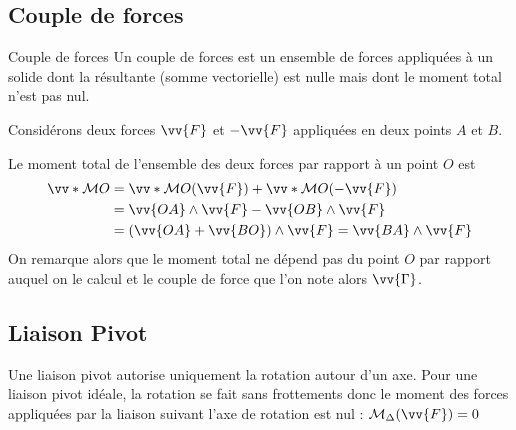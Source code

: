 \documentclass{cours}
\begin{document}
\subsection{Couple de forces}%
\label{sub:couple}
\begin{definition}{Couple de forces}
 Un couple de forces est un ensemble de forces appliquées à un solide dont la résultante (somme vectorielle) est nulle mais dont le moment total n'est pas nul. 
\end{definition}

Considérons deux forces $\vv{F}$ et $-\vv{F}$ appliquées en deux points $A$ et $B$. 
\begin{center}
\end{center}

Le moment total de l'ensemble des deux forces par rapport à un point $O$ est 
\begin{align}
  \vv*{\M}{O} &= \vv*{\M}{O}(\vv{F}) + \vv*{\M}{O}(-\vv{F}) \\
              &= \vv{OA}\wedge\vv{F} - \vv{OB}\wedge \vv{F} \\
              &= \left( \vv{OA} + \vv{BO} \right)\wedge \vv{F} = \vv{BA} \wedge \vv{F}
\end{align}
%
On remarque alors que le moment total ne dépend pas du point $O$ par rapport auquel on le calcul et le couple de force que l'on note alors $\vv{\Gamma}$.  

\subsection{Liaison Pivot}%
\label{sub:liaison_pivot}

Une liaison pivot autorise uniquement la rotation autour d'un axe. Pour une liaison pivot idéale, la rotation se fait sans frottements donc le moment des forces appliquées par la liaison suivant l'axe de rotation est nul : $\M_\Delta(\vv{F}) = 0$ 

\begin{center}
\end{center}
\end{document}
